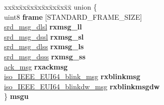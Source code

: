 \begin{DoxyCompactItemize}
\item 
\hypertarget{structevent__data__t_a41cc6c86b4308701dd5cd2111dc2f375}{\begin{tabbing}
xx\=xx\=xx\=xx\=xx\=xx\=xx\=xx\=xx\=\kill
union \{\\
\hypertarget{unionevent__data__t_1_1@2_a187be39ed3f72ed3501d55c4a04b5f27}{\>uint8 {\bfseries frame} \mbox{[}STANDARD\_FRAME\_SIZE\mbox{]}\\
\hypertarget{unionevent__data__t_1_1@2_a47db759d399f677e63accceec5e92192}{\>\hyperlink{structsrd__msg__dlsl}{srd\_msg\_dlsl} {\bfseries rxmsg\_ll}\\
\hypertarget{unionevent__data__t_1_1@2_a3f44a9a6224261872cbb694911e0464e}{\>\hyperlink{structsrd__msg__dssl}{srd\_msg\_dssl} {\bfseries rxmsg\_sl}\\
\hypertarget{unionevent__data__t_1_1@2_ac760081f1f4df83bd226e0ccec6e8145}{\>\hyperlink{structsrd__msg__dlss}{srd\_msg\_dlss} {\bfseries rxmsg\_ls}\\
\hypertarget{unionevent__data__t_1_1@2_aafb94785a6bfaaed12810d338f37b5d0}{\>\hyperlink{structsrd__msg__dsss}{srd\_msg\_dsss} {\bfseries rxmsg\_ss}\\
\hypertarget{unionevent__data__t_1_1@2_acd9284ed389a8e0fadd84070aa10c476}{\>\hyperlink{structack__msg}{ack\_msg} {\bfseries rxackmsg}\\
\hypertarget{unionevent__data__t_1_1@2_a074cfbf3561ca1f435a7e3cf6db2680d}{\>\hyperlink{structiso__IEEE__EUI64__blink__msg}{iso\_IEEE\_EUI64\_blink\_msg} {\bfseries rxblinkmsg}\\
\hypertarget{unionevent__data__t_1_1@2_ae7234eb58d36fd53cc53b7435533b959}{\>\hyperlink{structiso__IEEE__EUI64__blinkdw__msg}{iso\_IEEE\_EUI64\_blinkdw\_msg} {\bfseries rxblinkmsgdw}\\
\} {\bfseries msgu}}\label{structevent__data__t_a41cc6c86b4308701dd5cd2111dc2f375}
\\

}}}}}}}
\end{tabbing}}
\end{DoxyCompactItemize}
